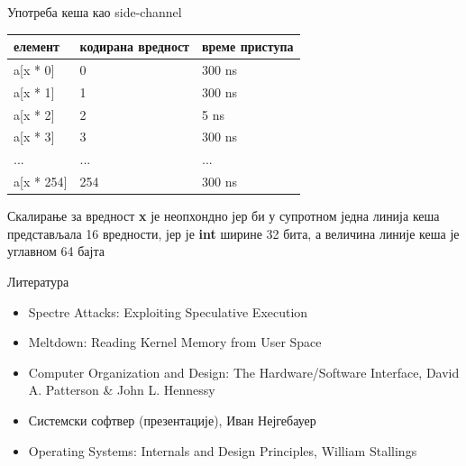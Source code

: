 \documentclass[xcolor=table]{beamer}
\begin{document}
\begin{frame}[allowframebreaks]{Употреба кеша као side-channel}
        \framebreak
        
        \begin{table}[]
            \begin{tabular}{|l|l|l|}
                \hline
                елемент                             & кодирана вредност        & време приступа                \\ \hline
                \rowcolor[HTML]{FD6864} 
                a{[}x * 0{]}                        & 0                        & 300 ns                        \\ \hline
                \rowcolor[HTML]{FD6864}
                a{[}x * 1{]}                        & 1                        & 300 ns                        \\ \hline
                \rowcolor[HTML]{67FD9A} 
                a{[}x * 2{]}                        & 2                        & 5 ns                          \\ \hline
                \rowcolor[HTML]{FD6864}
                a{[}x * 3{]}                        & 3                        & 300 ns                        \\ \hline
                ...                                 & ...                      & ...                           \\ \hline
                \rowcolor[HTML]{FD6864}
                a{[}x * 254{]}                      & 254                      & 300 ns                        \\ \hline
            \end{tabular}
        \end{table}
        
        Скалирање за вредност \textbf{x} је неопхондно јер би у супротном једна линија кеша представљала 16 вредности, јер је \textbf{int} ширине 32 бита,
        а величина линије кеша је углавном 64 бајта 
    \end{frame}
    
    \begin{frame}{Литература}
        \begin{itemize}
            \item Spectre Attacks: Exploiting Speculative Execution
            \item Meltdown: Reading Kernel Memory from User Space
            \item Computer Organization and Design: The Hardware/Software Interface, David A. Patterson \& John L. Hennessy
            \item Системски софтвер (презентације), Иван Нејгебауер
            \item Operating Systems: Internals and Design Principles, William Stallings
        \end{itemize}
    \end{frame}
\end{document}
